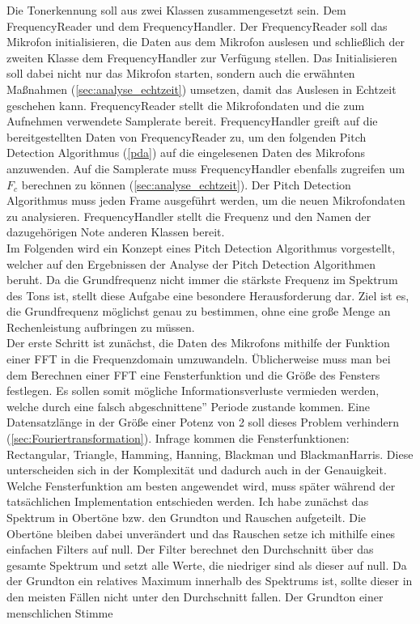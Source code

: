 Die Tonerkennung soll aus zwei Klassen zusammengesetzt sein. Dem FrequencyReader und dem FrequencyHandler. Der FrequencyReader soll das Mikrofon initialisieren, die Daten aus dem Mikrofon auslesen und schließlich der zweiten Klasse dem FrequencyHandler zur Verfügung stellen. Das Initialisieren soll dabei nicht nur das Mikrofon starten, sondern auch die erwähnten Maßnahmen (\ref{sec:analyse_echtzeit}) umsetzen, damit das Auslesen in Echtzeit geschehen kann. FrequencyReader stellt die Mikrofondaten und die zum Aufnehmen verwendete Samplerate bereit. FrequencyHandler greift auf die bereitgestellten Daten von FrequencyReader zu, um den folgenden Pitch Detection Algorithmus (\ref{pda}) auf die eingelesenen Daten des Mikrofons anzuwenden. Auf die Samplerate muss FrequencyHandler ebenfalls zugreifen um $F_c$ berechnen zu können (\ref{sec:analyse_echtzeit}). Der Pitch Detection Algorithmus muss jeden Frame ausgeführt werden, um die neuen Mikrofondaten zu analysieren. FrequencyHandler stellt die Frequenz und den Namen der dazugehörigen Note anderen Klassen bereit.\\
Im Folgenden wird ein Konzept eines Pitch Detection Algorithmus vorgestellt, welcher auf den Ergebnissen der Analyse der Pitch Detection Algorithmen beruht. Da die Grundfrequenz nicht immer die stärkste Frequenz im Spektrum des Tons ist, stellt diese Aufgabe eine besondere Herausforderung dar. Ziel ist es, die Grundfrequenz möglichst genau zu bestimmen, ohne eine große Menge an Rechenleistung aufbringen zu müssen. \\
Der erste Schritt ist zunächst, die Daten des Mikrofons mithilfe der Funktion einer FFT in die Frequenzdomain umzuwandeln. Üblicherweise muss man bei dem Berechnen einer FFT eine Fensterfunktion und die Größe des Fensters festlegen. Es sollen somit mögliche Informationsverluste vermieden werden, welche durch eine falsch \glqq abgeschnittene'' Periode zustande kommen. Eine Datensatzlänge in der Größe einer Potenz von 2 soll dieses Problem verhindern (\ref{sec:Fouriertransformation}). Infrage kommen die Fensterfunktionen: Rectangular, Triangle, Hamming, Hanning, Blackman und BlackmanHarris. Diese unterscheiden sich in der Komplexität und dadurch auch in der Genauigkeit. Welche Fensterfunktion am besten angewendet wird, muss später während der tatsächlichen Implementation entschieden werden.
Ich habe zunächst das Spektrum in Obertöne bzw. den Grundton und Rauschen aufgeteilt. Die Obertöne bleiben dabei unverändert und das Rauschen setze ich mithilfe eines einfachen Filters auf null. Der Filter berechnet den Durchschnitt über das gesamte Spektrum und setzt alle Werte, die niedriger sind als dieser auf null. Da der Grundton ein relatives Maximum innerhalb des Spektrums ist, sollte dieser in den meisten Fällen nicht unter den Durchschnitt fallen. Der Grundton einer menschlichen Stimme 
